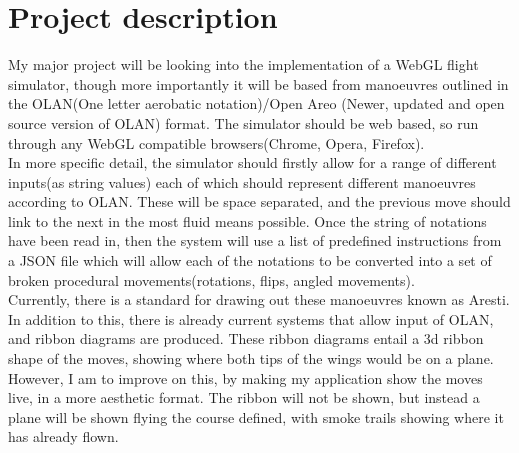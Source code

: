 \documentclass[11pt,fleqn,twoside]{article}
\begin{document}
\wordcount{}
\mmp

\setcounter{tocdepth}{3}


\section{Project description}
My major project will be looking into the implementation of a WebGL flight simulator, though more importantly it will be based from manoeuvres outlined in the OLAN\cite{Olan}(One letter aerobatic notation)/Open Areo\cite{OpenAero} (Newer, updated and open source version of OLAN) format. The simulator should be web based, so run through any WebGL compatible browsers(Chrome, Opera, Firefox).\\
In more specific detail, the simulator should firstly allow for a range of different inputs(as string values) each of which should represent different manoeuvres according to OLAN. These will be space separated, and the previous move should link to the next in the most fluid means possible. Once the string of notations have been read in, then the system will use a list of predefined instructions from a JSON file which will allow each of the notations to be converted into a set of broken procedural movements(rotations, flips, angled movements).\\
Currently, there is a standard for drawing out these manoeuvres known as Aresti\cite{Aresti}. In addition to this, there is already current systems that allow input of OLAN, and ribbon diagrams are produced. These ribbon diagrams entail a 3d ribbon shape of the moves, showing where both tips of the wings would be on a plane. However, I am to improve on this, by making my application show the moves live, in a more aesthetic format. The ribbon will not be shown, but instead a plane will be shown flying the course defined, with smoke trails showing where it has already flown.  \\
\end{document}
